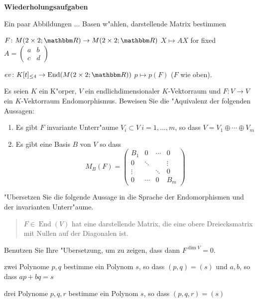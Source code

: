 \documentclass[a4,11pt]{article}
\DeclareMathOperator{\End}{End}
\begin{document}
\bigskip
{\Large \bfseries Wiederholungsaufgaben}
\bigskip

\begin{aufgabe}
  Ein paar Abbildungen ... Basen w"ahlen, darstellende Matrix bestimmen

  $F \colon M(2 \times 2; \R) \to M(2 \times 2; \R)$ $X \mapsto AX$
  for fixed $A =
  \left( \begin{smallmatrix}a&b\\c&d\end{smallmatrix}\right)$  
  
  $ev \colon K[t]_{\le 4} \to \End(M(2 \times 2; \R))$ $p \mapsto
  p(F)$ ($F$ wie oben).
\end{aufgabe}

\begin{aufgabe}
Es seien $K$ ein K"orper, $V$ ein endlichdimensionaler $K$-Vektorraum und $F : V \rightarrow V$ ein $K$-Vektorraum Endomorphismus. Beweisen Sie die "Aquivalenz der folgenden Aussagen:


\begin{enumerate}
\item Es gibt $F$ invariante Unterr"aume $V_i \subset V \ i= 1,\dots , m$, so dass $V = V_1 \oplus \cdots \oplus V_m$
\item Es gibt eine Basis $B$ von $V$ so dass 
\[
M_B(F) = \begin{pmatrix}B_1 & 0 & \cdots& 0\\
0& \ddots & & \vdots \\
\vdots & & \ddots& 0 \\
0 & \cdots & 0 & B_m
\end{pmatrix}
\]
\end{enumerate}
\end{aufgabe}

\begin{aufgabe}
  "Ubersetzen Sie die folgende Aussage in die Sprache der
  Endomorphismen und der invarianten Unterr"aume.
  \begin{quotation}
    $F \in \End(V)$ hat eine darstellende Matrix, die eine obere
    Dreiecksmatrix mit Nullen auf der Diagonalen ist.
  \end{quotation}

  Benutzen Sie Ihre "Ubersetzung, um zu zeigen, dass dann $F^{\dim V}
  = 0$.
\end{aufgabe}

\begin{aufgabe}
  zwei Polynome $p,q$ bestimme ein Polynom $s$, so dass $(p,q) = (s)$
  und $a,b$, so dass $ap+bq=s$

  drei Polynome $p,q,r$ bestimme ein Polynom $s$, so dass $(p,q,r) = (s)$
\end{aufgabe}
\end{document}
